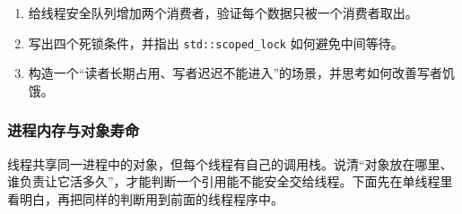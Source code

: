 \begin{exercise}\label{ex:v1-cpp-classic}

\begin{enumerate}
    \item 给线程安全队列增加两个消费者，验证每个数据只被一个消费者取出。
    \item 写出四个死锁条件，并指出 \texttt{std::scoped\_lock} 如何避免中间等待。
    \item 构造一个“读者长期占用、写者迟迟不能进入”的场景，并思考如何改善写者饥饿。
\end{enumerate}
\end{exercise}

\subsubsection{进程内存与对象寿命}
线程共享同一进程中的对象，但每个线程有自己的调用栈。说清“对象放在哪里、谁负责让它活多久”，才能判断一个引用能不能安全交给线程。下面先在单线程里看明白，再把同样的判断用到前面的线程程序中。

